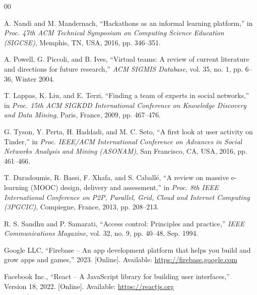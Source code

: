 \documentclass[conference]{IEEEtran}
\begin{document}
\begin{thebibliography}{00}

A. Nandi and M. Mandernach, ``Hackathons as an informal learning platform,'' in \textit{Proc. 47th ACM Technical Symposium on Computing Science Education (SIGCSE)}, Memphis, TN, USA, 2016, pp. 346--351.

A. Powell, G. Piccoli, and B. Ives, ``Virtual teams: A review of current literature and directions for future research,'' \textit{ACM SIGMIS Database}, vol. 35, no. 1, pp. 6--36, Winter 2004.

T. Lappas, K. Liu, and E. Terzi, ``Finding a team of experts in social networks,'' in \textit{Proc. 15th ACM SIGKDD International Conference on Knowledge Discovery and Data Mining}, Paris, France, 2009, pp. 467--476.

G. Tyson, Y. Perta, H. Haddadi, and M. C. Seto, ``A first look at user activity on Tinder,'' in \textit{Proc. IEEE/ACM International Conference on Advances in Social Networks Analysis and Mining (ASONAM)}, San Francisco, CA, USA, 2016, pp. 461--466.

T. Daradoumis, R. Bassi, F. Xhafa, and S. Caball\'{e}, ``A review on massive e-learning (MOOC) design, delivery and assessment,'' in \textit{Proc. 8th IEEE International Conference on P2P, Parallel, Grid, Cloud and Internet Computing (3PGCIC)}, Compiegne, France, 2013, pp. 208--213.

R. S. Sandhu and P. Samarati, ``Access control: Principles and practice,'' \textit{IEEE Communications Magazine}, vol. 32, no. 9, pp. 40--48, Sep. 1994.

Google LLC, ``Firebase -- An app development platform that helps you build and grow apps and games,'' 2023. [Online]. Available: \url{https://firebase.google.com}

Facebook Inc., ``React -- A JavaScript library for building user interfaces,'' Version 18, 2022. [Online]. Available: \url{https://reactjs.org}



\end{thebibliography}
\end{document}
